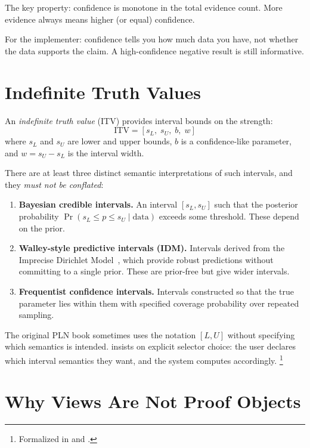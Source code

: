 \documentclass[11pt,openany]{report}
\begin{document}
The key property: confidence is monotone in the total evidence count.
More evidence always means higher (or equal) confidence.

For the implementer: confidence tells you how much data you have, not
whether the data supports the claim.  A high-confidence negative result
is still informative.

\section{Indefinite Truth Values}

An \emph{indefinite truth value} (ITV) provides interval bounds on the
strength:
\[
  \mathrm{ITV} = [s_L,\; s_U,\; b,\; w]
\]
where $s_L$ and $s_U$ are lower and upper bounds, $b$ is a confidence-like
parameter, and $w = s_U - s_L$ is the interval width.

There are at least three distinct semantic interpretations of such
intervals, and they \emph{must not be conflated}:

\begin{enumerate}
\item \textbf{Bayesian credible intervals.}  An interval
  $[s_L, s_U]$ such that the posterior probability
  $\Pr(s_L \le p \le s_U \mid \text{data})$ exceeds some threshold.
  These depend on the prior.

\item \textbf{Walley-style predictive intervals (IDM).}  Intervals
  derived from the Imprecise Dirichlet Model~\cite{Walley1991,Walley1996BagOfMarbles},
  which provide robust predictions without committing to a single prior.
  These are prior-free but give wider intervals.

\item \textbf{Frequentist confidence intervals.}  Intervals constructed
  so that the true parameter lies within them with specified coverage
  probability over repeated sampling.
\end{enumerate}

The original PLN book sometimes uses the notation $[L, U]$ without
specifying which semantics is intended.  \xiPLN{} insists on explicit
selector choice: the user declares which interval semantics they want,
and the system computes accordingly.%
\footnote{Formalized in  and
.}

\section{Why Views Are Not Proof Objects}
\label{sec:views-not-proof}
\end{document}
